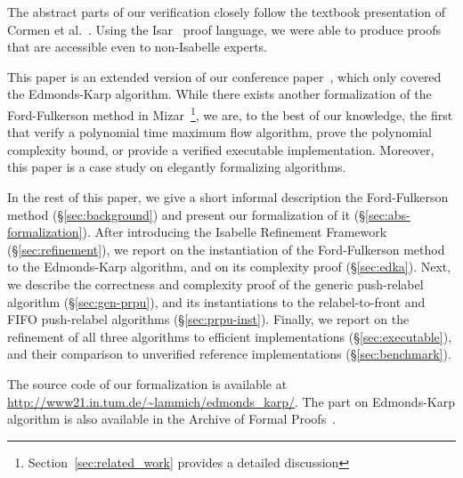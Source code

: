 \documentclass[smallcondensed]{svjour3}     %
\begin{document}
The abstract parts of our verification closely follow the textbook presentation of Cormen et al.~\cite{CLRS09}. 
Using the Isar~\cite{Wenzel99} proof language, we were able to produce proofs that are accessible even to non-Isabelle experts.

This paper is an extended version of our conference paper~\cite{LaSe16}, which only covered the Edmonds-Karp algorithm.
While there exists another formalization of the Ford-Fulkerson method in Mizar~\cite{Lee05}\footnote{Section~\ref{sec:related_work} provides a detailed discussion}, we are, to the best of our knowledge, the first that verify a polynomial time maximum flow algorithm, prove the polynomial complexity bound, or provide a verified executable implementation. Moreover, this paper is a case study on elegantly formalizing algorithms.

In the rest of this paper, we give a short informal description the Ford-Fulkerson method (\S\ref{sec:background})
and present our formalization of it (\S\ref{sec:abs-formalization}). After introducing the Isabelle Refinement Framework~\cite{LaTu12,La12} (\S\ref{sec:refinement}), we report on the instantiation of the Ford-Fulkerson method to the Edmonds-Karp algorithm, and on its complexity proof (\S\ref{sec:edka}).
Next, we describe the correctness and complexity proof of the generic push-relabel algorithm (\S\ref{sec:gen-prpu}), and its instantiations 
to the relabel-to-front and FIFO push-relabel algorithms (\S\ref{sec:prpu-inst}).
Finally, we report on the refinement of all three algorithms to efficient implementations (\S\ref{sec:executable}), and their comparison to unverified reference 
implementations (\S\ref{sec:benchmark}).

The source code of our formalization is available at \url{http://www21.in.tum.de/~lammich/edmonds_karp/}. 
The part on Edmonds-Karp algorithm is also available in the Archive of Formal Proofs~\cite{LaSe16_afp}.


\end{document}
